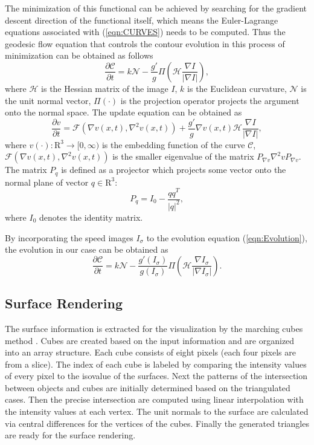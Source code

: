 The minimization of this functional can be achieved by searching for the gradient descent direction of the functional itself, which means the Euler-Lagrange equations associated with (\ref{eqn:CURVES}) needs to be computed. %
Thus the geodesic flow equation that controls the contour evolution in this process of minimization can be obtained as follows
\begin{equation}
\label{eqn:Evolution}
\frac{\partial \mathcal{C}}{\partial t} = k \mathcal{N} - \frac{g'}{g} \varPi \left( \mathcal{H} \frac{\nabla I}{ \left| \nabla I \right| } \right),
\end{equation}
where $\mathcal{H}$ is the Hessian matrix of the image $I$, $k$ is the Euclidean curvature, $\mathcal{N}$ is the unit normal vector, $\varPi(\cdot)$ is the projection operator projects the argument onto the normal space. %
The update equation can be obtained as
\begin{equation}
\label{eqn:Update}
\frac{\partial v}{\partial t} = \mathcal{F} \left( \nabla v(x, t), \nabla^2 v(x, t) \right) + \frac{g'}{g} \nabla v(x, t) \mathcal{H} \frac{\nabla I}{ \left| \nabla I \right| },
\end{equation}
where $v(\cdot): \mathrm{R}^3 \rightarrow [0, \infty)$ is the embedding function of the curve $\mathcal{C}$, $\mathcal{F} \left( \nabla v(x, t), \nabla^2 v(x, t) \right)$ is the smaller eigenvalue of the matrix $P_{\nabla v} \nabla^2 v P_{\nabla v}$. %
The matrix $P_q$ is defined as a projector which projects some vector onto the normal plane of vector $q \in \mathrm{R}^3$:
\begin{equation}
\label{eqn:ProjectionOperator}
P_q = I_0 - \frac{qq^T}{\left| q \right|^2},
\end{equation}
where $I_0$ denotes the identity matrix.

By incorporating the speed images $I_{\sigma}$ to the evolution equation (\ref{eqn:Evolution}), the evolution in our case can be obtained as
\begin{equation}
\label{eqn:Application}
\frac{\partial \mathcal{C}}{\partial t} = k \mathcal{N} - \frac{g'(I_{\sigma})}{g(I_{\sigma})} \varPi \left( \mathcal{H} \frac{\nabla I_{\sigma}}{ \left| \nabla I_{\sigma} \right| } \right).%
\end{equation}

\subsection{Surface Rendering}

The surface information is extracted for the visualization by the marching cubes method \cite{Lorensen1987MC}.
Cubes are created based on the input information and are organized into an array structure.
Each cube consists of eight pixels (each four pixels are from a slice).
The index of each cube is labeled by comparing the intensity values of every pixel to the isovalue of the surfaces.
Next the patterns of the intersection between objects and cubes are initially determined based on the triangulated cases.
Then the precise intersection are computed using linear interpolation with the intensity values at each vertex.
The unit normals to the surface are calculated via central differences for the vertices of the cubes.
Finally the generated triangles are ready for the surface rendering.